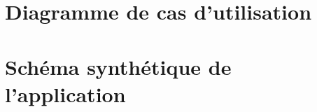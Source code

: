 \documentclass[10pt]{report}
\begin{document}
\section{Diagramme de cas d'utilisation}
	\begin{figure}[hp]
	      \begin{center}
	      \end{center}
	\end{figure}

\newpage
\section{Schéma synthétique de l'application}
	\begin{figure}[hp]
	      \begin{center}
	      \end{center}
	\end{figure}
\end{document}
